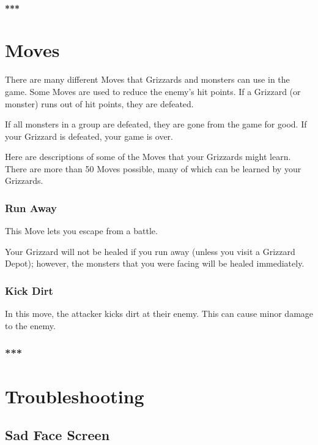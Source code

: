 \documentclass[12pt,openright,book]{memoir}
\begin{document}
\begin{description}
\subsubsection{***}

\chapter{Moves}\label{Moves}

There are  many different Moves that  Grizzards and monsters can  use in
the  game.  Some Moves  are  used  to  reduce  the enemy's  hit  points.
If a Grizzard (or monster) runs out of hit points, they are defeated.

If all  monsters in a  group are defeated, they  are gone from  the game
for good. If your Grizzard is defeated, your game is over.

Here  are  descriptions  of  some  of  the  Moves  that  your  Grizzards
might learn. There are more than 50 Moves possible, many of which can be
learned by your Grizzards.

\subsection{Run Away}

This Move lets you escape from a battle.

Your  Grizzard will  not be  healed if  you run  away (unless  you visit
a  Grizzard Depot);  however, the  monsters  that you  were facing  will
be healed immediately.

\subsection{Kick Dirt}

In this  move, the attacker  kicks dirt at  their enemy. This  can cause
minor damage to the enemy.

\subsection{***}

\chapter{Troubleshooting}

\section{Sad Face Screen}


\end{description}
\end{document}
